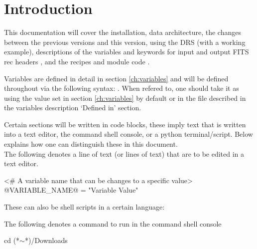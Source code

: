 \chapter{Introduction}
\label{chapter:intro}

This documentation will cover the installation, data architecture, \ifdevguide the changes between the previous versions and this version\fi, using the DRS (with a working example), descriptions of the variables \ifdevguide and keywords for input and output FITS rec headers \fi, and the recipes \ifdevguide and module code \fi.

\noindent Variables are defined in detail in section \ref{ch:variables} and will be defined throughout via the following syntax: . When refered to, one should take it as using the value set in section \ref{ch:variables} by default or in the file described in the variables description `Defined in' section.

\noindent Certain sections will be written in code blocks, these imply text that is written into a text editor, the command shell console, or a python terminal/script. Below explains how one can distinguish these in this document. \\

\noindent The following denotes a line of text (or lines of text) that are to be edited in a text editor.
\begin{textbox}
<# A variable name that can be changes to a specific value>
@VARIABLE_NAME@ = "Variable Value"
\end{textbox}
\vspace{0.5cm}

\noindent These can also be shell scripts in a certain language:
\vspace{0.5cm}

\noindent The following denotes a command to run in the command shell console 
\begin{cmdbox}
cd (*$\sim$*)/Downloads
\end{cmdbox}
\vspace{0.5cm}

